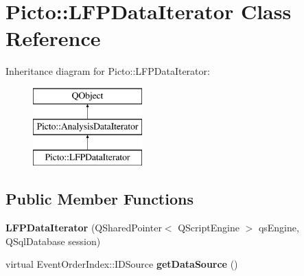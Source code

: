 \hypertarget{class_picto_1_1_l_f_p_data_iterator}{\section{Picto\-:\-:L\-F\-P\-Data\-Iterator Class Reference}
\label{class_picto_1_1_l_f_p_data_iterator}
}
Inheritance diagram for Picto\-:\-:L\-F\-P\-Data\-Iterator\-:\begin{figure}[H]
\begin{center}
\leavevmode
\includegraphics[height=3.000000cm]{class_picto_1_1_l_f_p_data_iterator}
\end{center}
\end{figure}
\subsection*{Public Member Functions}
\begin{DoxyCompactItemize}
\item 
\hypertarget{class_picto_1_1_l_f_p_data_iterator_aa434f973111e5f060929c2b022990b9f}{{\bfseries L\-F\-P\-Data\-Iterator} (Q\-Shared\-Pointer$<$ Q\-Script\-Engine $>$ qs\-Engine, Q\-Sql\-Database session)}\label{class_picto_1_1_l_f_p_data_iterator_aa434f973111e5f060929c2b022990b9f}

\item 
\hypertarget{class_picto_1_1_l_f_p_data_iterator_a9b650c2db58dfe415ac91edfd2a87fad}{virtual Event\-Order\-Index\-::\-I\-D\-Source {\bfseries get\-Data\-Source} ()}\label{class_picto_1_1_l_f_p_data_iterator_a9b650c2db58dfe415ac91edfd2a87fad}

\end{DoxyCompactItemize}
